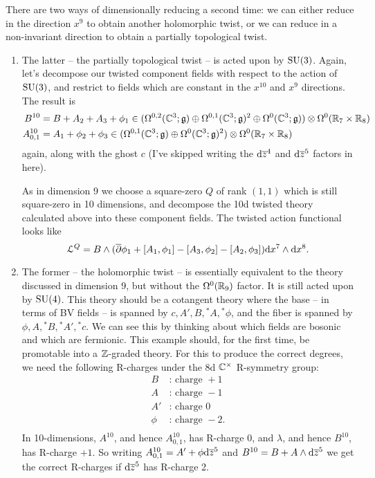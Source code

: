 \documentclass[10pt, oneside]{article}
\renewcommand{\d}{\mathrm{d}}
\newcommand{\st}[1]{{}^*{#1}}
\begin{document}
\begin{example}[8d $\mc N=1$ Super Yang-Mills]
There are two ways of dimensionally reducing a second time: we can either reduce in the direction $x^9$ to obtain another holomorphic twist, or we can reduce in a non-invariant direction to obtain a partially topological twist.  

\begin{enumerate}
\item The latter -- the partially topological twist -- is acted upon by $\mathrm{SU}(3)$.  Again, let's decompose our twisted component fields with respect to the action of $\mathrm{SU}(3)$, and restrict to fields which are constant in the $x^{10}$ and $x^9$ directions.  The result is
\begin{align*}
B^{10} &= B + A_2 + A_3 + \phi_1 \in (\Omega^{0,2}(\mathbb{C}^3; \mathfrak{g}) \oplus \Omega^{0,1}(\mathbb{C}^3; \mathfrak{g})^2\oplus \Omega^0(\mathbb{C}^3; \mathfrak{g})) \otimes \Omega^0(\mathbb{R}_7 \times \mathbb{R}_8)\\
A^{10}_{0,1} &= A_1 + \phi_2 + \phi_3 \in (\Omega^{0,1}(\mathbb{C}^3; \mathfrak{g}) \oplus \Omega^0(\mathbb{C}^3; \mathfrak{g})^2) \otimes \Omega^0(\mathbb{R}_7 \times \mathbb{R}_8)
\end{align*}
again, along with the ghost $c$ (I've skipped writing the $\d \ol z^4$ and $\d \ol z^5$ factors in here).

As in dimension 9 we choose a square-zero $Q$ of rank $(1,1)$ which is still square-zero in 10 dimensions, and decompose the 10d twisted theory calculated above into these component fields.  The twisted action functional looks like
\[\LL^Q = B \wedge (\ol \dd \phi_1 + [A_1,\phi_1] - [A_3,\phi_2] - [A_2,\phi_3]) \d x^7 \wedge \d x^8.\]

\item The former -- the holomorphic twist -- is essentially equivalent to the theory discussed in dimension 9, but without the $\Omega^0(\mathbb{R}_9)$ factor.  It is still acted upon by $\mathrm{SU}(4)$.  This theory should be a cotangent theory where the base -- in terms of BV fields -- is spanned by $c, A', B, \st A, \st \phi$, and the fiber is spanned by $\phi, A, \st B, \st A', \st c$.  We can see this by thinking about which fields are bosonic and which are fermionic.  This example should, for the first time, be promotable into a $\mathbb{Z}$-graded theory.  For this to produce the correct degrees, we need the following R-charges under the 8d $\mathbb{C}^\times$ R-symmetry group:
\begin{align*}
B &\text{: charge } +1 \\
A &\text{: charge } -1 \\
A' &\text{: charge } 0 \\
\phi &\text{: charge } -2. \\
\end{align*}
In 10-dimensions, $A^{10}$, and hence $A_{0,1}^{10}$, has R-charge 0, and $\lambda$, and hence $B^{10}$, has R-charge $+1$.  So writing $A_{0,1}^{10} = A' + \phi \d \ol z^5$ and $B^{10} = B + A \wedge \d \ol z^5$ we get the correct R-charges if $\d \ol z^5$ has R-charge 2.


\end{enumerate}
\end{example}
\end{document}
